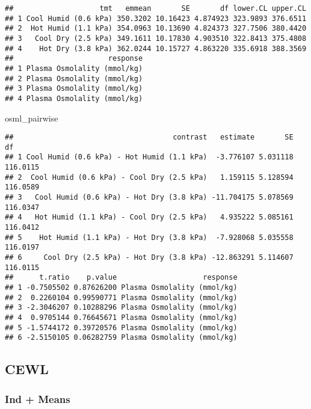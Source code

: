 \documentclass[
]{article}
\newenvironment{Shaded}{\begin{snugshade}}{\end{snugshade}}
\newcommand{\NormalTok}[1]{#1}
\begin{document}
\begin{verbatim}
##                    tmt   emmean       SE       df lower.CL upper.CL
## 1 Cool Humid (0.6 kPa) 350.3202 10.16423 4.874923 323.9893 376.6511
## 2  Hot Humid (1.1 kPa) 354.0963 10.13690 4.824373 327.7506 380.4420
## 3   Cool Dry (2.5 kPa) 349.1611 10.17830 4.903510 322.8413 375.4808
## 4    Hot Dry (3.8 kPa) 362.0244 10.15727 4.863220 335.6918 388.3569
##                      response
## 1 Plasma Osmolality (mmol/kg)
## 2 Plasma Osmolality (mmol/kg)
## 3 Plasma Osmolality (mmol/kg)
## 4 Plasma Osmolality (mmol/kg)
\end{verbatim}

\begin{Shaded}
\begin{Highlighting}[]
\NormalTok{osml\_pairwise}
\end{Highlighting}
\end{Shaded}

\begin{verbatim}
##                                     contrast   estimate       SE       df
## 1 Cool Humid (0.6 kPa) - Hot Humid (1.1 kPa)  -3.776107 5.031118 116.0115
## 2  Cool Humid (0.6 kPa) - Cool Dry (2.5 kPa)   1.159115 5.128594 116.0589
## 3   Cool Humid (0.6 kPa) - Hot Dry (3.8 kPa) -11.704175 5.078569 116.0347
## 4   Hot Humid (1.1 kPa) - Cool Dry (2.5 kPa)   4.935222 5.085161 116.0412
## 5    Hot Humid (1.1 kPa) - Hot Dry (3.8 kPa)  -7.928068 5.035558 116.0197
## 6     Cool Dry (2.5 kPa) - Hot Dry (3.8 kPa) -12.863291 5.114607 116.0115
##      t.ratio    p.value                    response
## 1 -0.7505502 0.87626200 Plasma Osmolality (mmol/kg)
## 2  0.2260104 0.99590771 Plasma Osmolality (mmol/kg)
## 3 -2.3046207 0.10288296 Plasma Osmolality (mmol/kg)
## 4  0.9705144 0.76645671 Plasma Osmolality (mmol/kg)
## 5 -1.5744172 0.39720576 Plasma Osmolality (mmol/kg)
## 6 -2.5150105 0.06282759 Plasma Osmolality (mmol/kg)
\end{verbatim}

\hypertarget{cewl-2}{%
\subsection{CEWL}\label{cewl-2}}

\hypertarget{ind-means-3}{%
\subsubsection{Ind + Means}\label{ind-means-3}}
\end{document}

